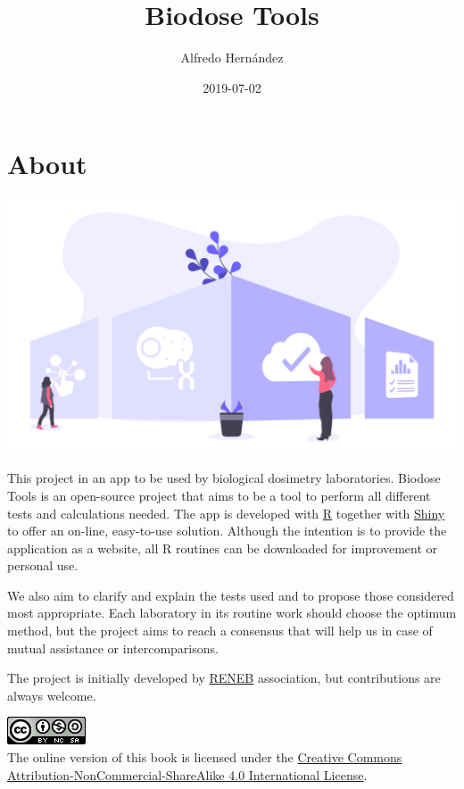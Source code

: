 \documentclass[]{scrartcl}
\title{Biodose Tools}
\author{Alfredo Hernández}
\date{2019-07-02}
\begin{document}

\maketitle

{
\setcounter{tocdepth}{2}
\tableofcontents
}
\hypertarget{about}{%
\section*{About}\label{about}}

\includegraphics{images/home.pdf}

This project in an app to be used by biological dosimetry laboratories. Biodose Tools is an open-source project that aims to be a tool to perform all different tests and calculations needed. The app is developed with \href{https://www.r-project.org/about.html}{R} \citep{R-base} together with \href{https://shiny.rstudio.com}{Shiny} \citep{R-shiny} to offer an on-line, easy-to-use solution. Although the intention is to provide the application as a website, all R routines can be downloaded for improvement or personal use.

We also aim to clarify and explain the tests used and to propose those considered most appropriate. Each laboratory in its routine work should choose the optimum method, but the project aims to reach a consensus that will help us in case of mutual assistance or intercomparisons.

The project is initially developed by \href{http://www.reneb.net}{RENEB} association, but contributions are always welcome.

\includegraphics{images/by-nc-sa.png}\\
The online version of this book is licensed under the \href{http://creativecommons.org/licenses/by-nc-sa/4.0/}{Creative Commons Attribution-NonCommercial-ShareAlike 4.0 International License}.
\end{document}
